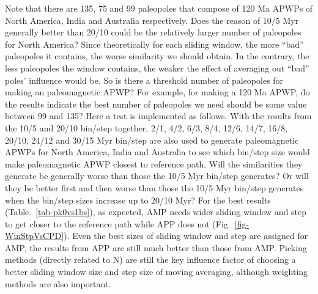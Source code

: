 Note that there are 135, 75 and 99 paleopoles that compose of 120 Ma
APWPs of North America, India and Australia respectively. Does the reason of
10/5 Myr generally better than 20/10 could be the relatively larger number of
paleopoles for North America? Since theoretically for each sliding window, the
more ``bad'' paleopoles it contains, the worse similarity we should obtain. In
the contrary, the less paleopoles the window contains, the weaker the effect of
averaging out ``bad'' poles' influence would be. So is there a threshold number
of paleopoles for making an paleomagnetic APWP\@? For example, for making a
120 Ma APWP, do the results indicate the best number of paleopoles
we need should be some value between 99 and 135? Here a test is implemented as
follows. With the results from the 10/5 and 20/10 bin/step together, 2/1, 4/2,
6/3, 8/4, 12/6, 14/7, 16/8, 20/10, 24/12 and 30/15 Myr bin/step are also used to
generate paleomagnetic APWPs for North America, India and Australia to see which
bin/step size would make paleomagnetic APWP closest to reference path. Will the
similarities they generate be generally worse than those the 10/5 Myr bin/step
generates? Or will they be better first and then worse than those the 10/5 Myr
bin/step generates when the bin/step sizes increase up to 20/10 Myr? For the
best results (Table.~\ref{tab-pk0vs1bs}), as expected, AMP needs wider sliding
window and step to get closer to the reference path while APP does not
(Fig.~\ref{fig-WinStpVsCPD}). Even the best sizes of sliding window and step are
assigned for AMP, the results from APP are still much better than those from
AMP\@. Picking methods (directly related to N) are still the key influence
factor of choosing a better sliding window size and step size of moving
averaging, although weighting methods are also important.

